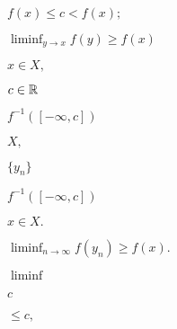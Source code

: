 \documentclass[10pt]{book}
\begin{document}
\begin{mdSnippets}
\begin{mdInlineSnippet}[64aeb0854b6be22f9260ec37b284b802]%
$f(x) \le c < f(x);$\end{mdInlineSnippet}%
\begin{mdInlineSnippet}[8d165ac5c24372382035b830c7d8328c]%
$\liminf_{y \to x} f(y) \ge f(x)$\end{mdInlineSnippet}%
\begin{mdInlineSnippet}%
$x \in X,$\end{mdInlineSnippet}%
\begin{mdInlineSnippet}%
$c \in \mathbb{R}$\end{mdInlineSnippet}%
\begin{mdInlineSnippet}[2e76e87b3447a2eda956d861af860dd2]%
$f^{-1}([-\infty, c])$\end{mdInlineSnippet}%
\begin{mdInlineSnippet}[412bd1def2f1b61da9169d88e6c8b9e9]%
$X,$\end{mdInlineSnippet}%
\begin{mdInlineSnippet}%
$\{y_n\}$\end{mdInlineSnippet}%
\begin{mdInlineSnippet}[2e76e87b3447a2eda956d861af860dd2]%
$f^{-1}([-\infty, c])$\end{mdInlineSnippet}%
\begin{mdInlineSnippet}[94a3ac7461d7486024cf3d570269399e]%
$x \in X.$\end{mdInlineSnippet}%
\begin{mdInlineSnippet}[1465ad70ebf69c16861e175d6e139742]%
$\liminf_{n \to \infty} f(y_n) \ge f(x).$\end{mdInlineSnippet}%
\begin{mdInlineSnippet}[453958d8465f2429dc41b22f010c89dd]%
$\liminf$\end{mdInlineSnippet}%
\begin{mdInlineSnippet}[4a8a08f09d37b73795649038408b5f33]%
$c$\end{mdInlineSnippet}%
\begin{mdInlineSnippet}%
$\le c,$\end{mdInlineSnippet}%

\end{mdSnippets}
\end{document}
